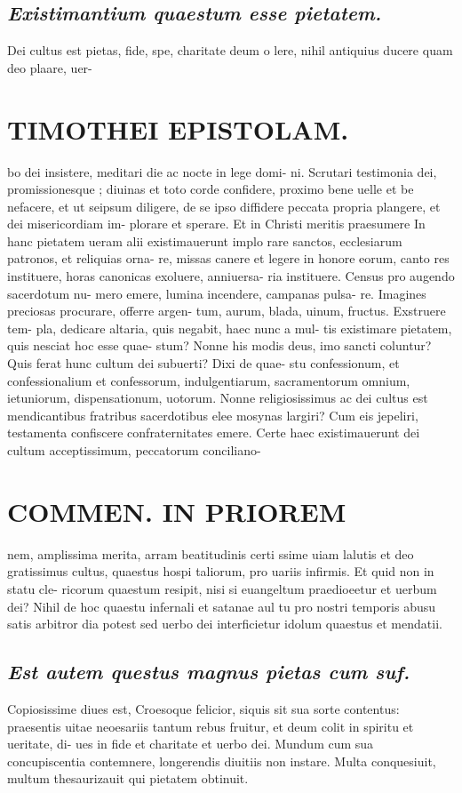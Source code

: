\documentclass{article}
\begin{document}
\begin{pages}
\subsection*{\textit{Existimantium quaestum esse pietatem. }}\pstart Dei cultus est pietas, fide, spe, charitate deum o lere, nihil antiquius ducere quam deo plaare, uer-  \pend
\section*{TIMOTHEI EPISTOLAM. }
\marginpar{[ p.161 ]}\pstart bo dei insistere, meditari die ac nocte in lege domi- ni. Scrutari testimonia dei, promissionesque ; diuinas et toto corde confidere, proximo bene uelle et be nefacere, et ut seipsum diligere, de se ipso diffidere peccata propria plangere, et dei misericordiam im- plorare et sperare. Et in Christi meritis praesumere In hanc pietatem ueram alii existimauerunt implo rare sanctos, ecclesiarum patronos, et reliquias orna- re, missas canere et legere in honore eorum, canto res instituere, horas canonicas exoluere, anniuersa- ria instituere. Census pro augendo sacerdotum nu- mero emere, lumina incendere, campanas pulsa- re. Imagines preciosas procurare, offerre argen- tum, aurum, blada, uinum, fructus. Exstruere tem- pla, dedicare altaria, quis negabit, haec nunc a mul- tis existimare pietatem, quis nesciat hoc esse quae- stum? Nonne his modis deus, imo sancti coluntur? Quis ferat hunc cultum dei subuerti? Dixi de quae- stu confessionum, et confessionalium et confessorum, indulgentiarum, sacramentorum omnium, ietuniorum, dispensationum, uotorum. Nonne religiosissimus ac dei cultus est mendicantibus fratribus sacerdotibus elee mosynas largiri? Cum eis jepeliri, testamenta confiscere confraternitates emere. Certe haec existimauerunt dei cultum acceptissimum, peccatorum conciliano-  \pend
\section*{COMMEN. IN PRIOREM }
\marginpar{[ p.162 ]}\pstart nem, amplissima merita, arram beatitudinis certi ssime uiam lalutis et deo gratissimus cultus, quaestus hospi taliorum, pro uariis infirmis. Et quid non in statu cle- ricorum quaestum resipit, nisi si euangeltum praedioeetur et uerbum dei? Nihil de hoc quaestu infernali et satanae aul tu pro nostri temporis abusu satis arbitror dia potest sed uerbo dei interficietur idolum quaestus et mendatii.  \pend
{}
{}
\subsection*{\textit{Est autem questus magnus pietas cum suf. }}\pstart Copiosissime diues est, Croesoque felicior, siquis sit sua sorte contentus: praesentis uitae neoesariis tantum rebus fruitur, et deum colit in spiritu et ueritate, di- ues in fide et charitate et uerbo dei. Mundum cum sua concupiscentia contemnere, longerendis diuitiis non instare. Multa conquesiuit, multum thesaurizauit qui pietatem obtinuit.  \pend
{}
{}

\end{pages}
\end{document}
